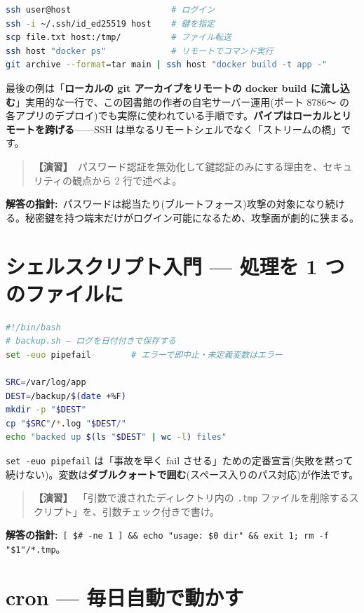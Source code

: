 \documentclass{article}
\begin{document}
\begin{lstlisting}[language=bash]
ssh user@host                    # ログイン
ssh -i ~/.ssh/id_ed25519 host    # 鍵を指定
scp file.txt host:/tmp/          # ファイル転送
ssh host "docker ps"             # リモートでコマンド実行
git archive --format=tar main | ssh host "docker build -t app -"
\end{lstlisting}

最後の例は「\textbf{ローカルの git アーカイブをリモートの docker build に流し込む}」実用的な一行で、この図書館の作者の自宅サーバー運用(ポート 8786〜 の各アプリのデプロイ)でも実際に使われている手順です。\textbf{パイプはローカルとリモートを跨げる}——SSH は単なるリモートシェルでなく「ストリームの橋」です。

\begin{quote}
\textbf{【演習】}\ パスワード認証を無効化して鍵認証のみにする理由を、セキュリティの観点から 2 行で述べよ。
\end{quote}

\textbf{解答の指針:}\ パスワードは総当たり(ブルートフォース)攻撃の対象になり続ける。秘密鍵を持つ端末だけがログイン可能になるため、攻撃面が劇的に狭まる。

\section{シェルスクリプト入門 — 処理を 1 つのファイルに}

\begin{lstlisting}[language=bash]
#!/bin/bash
# backup.sh — ログを日付付きで保存する
set -euo pipefail        # エラーで即中止・未定義変数はエラー

SRC=/var/log/app
DEST=/backup/$(date +%F)
mkdir -p "$DEST"
cp "$SRC"/*.log "$DEST/"
echo "backed up $(ls "$DEST" | wc -l) files"
\end{lstlisting}

\texttt{set -euo pipefail} は「事故を早く fail させる」ための定番宣言(失敗を黙って続けない)。変数は\textbf{ダブルクォートで囲む}(スペース入りのパス対応)が作法です。

\begin{quote}
\textbf{【演習】}\ 「引数で渡されたディレクトリ内の \texttt{.tmp} ファイルを削除するスクリプト」を、引数チェック付きで書け。
\end{quote}

\textbf{解答の指針:}\ \texttt{[ \$\# -ne 1 ] \&\& echo "usage: \$0 dir" \&\& exit 1; rm -f "\$1"/*.tmp}。

\section{cron — 毎日自動で動かす}
\end{document}
